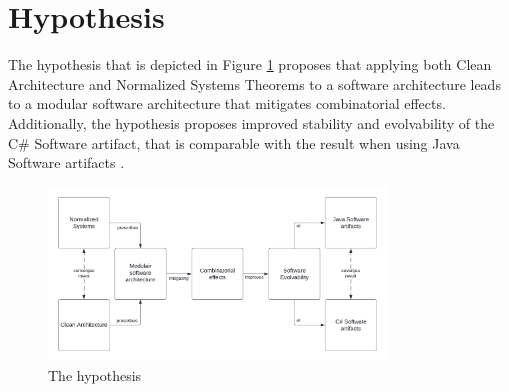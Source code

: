 \section{Hypothesis} \label{hypothesis} 

The hypothesis that is depicted in Figure \ref{fig:hypothesis} proposes
that applying both Clean Architecture and Normalized Systems Theorems to a software
architecture leads to a modular software architecture that mitigates combinatorial
effects. Additionally, the hypothesis proposes improved stability and evolvability of
the C\# Software artifact, that is comparable with the result when using Java Software
artifacts \parencites[]{oorts_building_2014, de_bruyn_enabling_2018}.

\begin{figure}[!h]
    \centering
    \includegraphics[width=0.8\textwidth]{Figures/hypothesis.pdf}
    \caption[The hypothesis]{The hypothesis}
    \label{fig:hypothesis}
\end{figure}
